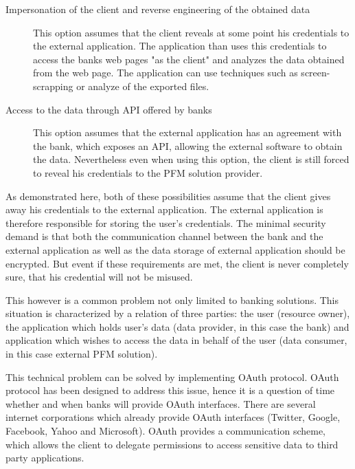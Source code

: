 \begin{description}
	\item [Impersonation of the client and reverse engineering of the obtained data]
This option assumes that the client reveals at some point his credentials to the external application. The application than uses this credentials to access the banks web pages "as the client" and analyzes the data obtained from the web page. The application can use techniques such as screen-scrapping or analyze of the exported files.

	\item [Access to the data through API offered by banks]
This option assumes that the external application has an agreement with the bank, which exposes an API, allowing the external software to obtain the data. Nevertheless even when using this option, the client is still forced to reveal his credentials to the PFM solution provider.
\end{description}

As demonstrated here, both of these possibilities assume that the client gives away his credentials to the external application. The external application is therefore responsible for storing the user's credentials. The minimal security demand is that both the communication channel between the bank and the external application as well as the data storage of external application should be encrypted. But event if these requirements are met, the client is never completely sure, that his credential will not be misused.

This however is a common problem not only limited to banking solutions. This situation is characterized by a relation of three parties: the user (resource owner), the application which holds user's data (data provider, in this case the bank) and application which wishes to access the data in behalf of the user (data consumer, in this case external PFM solution).

This technical problem can be solved by implementing OAuth\cite{OAuth11} protocol. OAuth protocol has been designed to address this issue, hence it is a question of time whether and when banks will provide OAuth interfaces. There are several internet corporations which already provide OAuth interfaces (Twitter, Google, Facebook, Yahoo and Microsoft). OAuth provides a communication scheme, which allows the client to delegate permissions to access sensitive data to third party applications.

